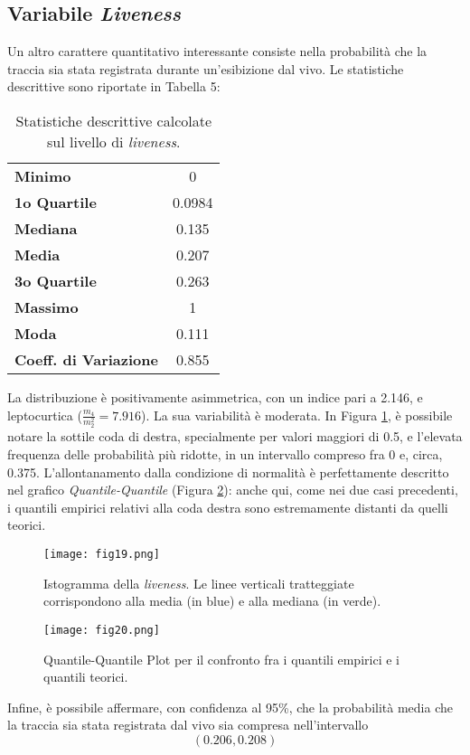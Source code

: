 \documentclass[fleqn,10pt]{SelfArx} %
\begin{document}
\subsection*{Variabile \textit{Liveness}}
Un altro carattere quantitativo interessante consiste nella probabilità che la traccia sia stata registrata durante un'esibizione dal vivo. Le statistiche descrittive sono riportate in Tabella 5:
{\begin{table}[H]
\centering

\begin{tabular}[t]{lc}
\toprule
\midrule
\textbf{Minimo}&0\\
\textbf{1o Quartile}&0.0984\\
\textbf{Mediana}&0.135\\
\textbf{Media}&0.207\\
\textbf{3o Quartile}&0.263\\
\textbf{Massimo}&1\\
\textbf{Moda}&0.111\\
\textbf{Coeff. di Variazione}&0.855\\
\bottomrule
\end{tabular}
\caption{Statistiche descrittive calcolate sul livello di \textit{liveness}.}
\end{table}}
La distribuzione è positivamente asimmetrica, con un indice pari a 2.146, e leptocurtica ($\frac{m_4}{m_2^{2}}=7.916$). La sua variabilità è moderata. In Figura \ref{fig:fig19}, è possibile notare la sottile coda di destra, specialmente per valori maggiori di 0.5, e l'elevata frequenza delle probabilità più ridotte, in un intervallo compreso fra 0 e, circa, 0.375. L'allontanamento dalla condizione di normalità è perfettamente descritto nel grafico \textit{Quantile-Quantile} (Figura \ref{fig:fig20}): anche qui, come nei due casi precedenti, i quantili empirici relativi alla coda destra sono estremamente distanti da quelli teorici.
\begin{figure}[H]
    \centering
    \texttt{[image: fig19.png]}
    \label{fig:fig19}
    \caption{Istogramma della \textit{liveness}. Le linee verticali tratteggiate corrispondono alla media (in blue) e alla mediana (in verde).}
\end{figure}
\begin{figure}[H]
    \centering
    \texttt{[image: fig20.png]}
    \label{fig:fig20}
    \caption{Quantile-Quantile Plot per il confronto fra i quantili empirici e i quantili teorici.}
\end{figure}
Infine, è possibile affermare, con confidenza al 95\%, che la probabilità media che la traccia sia stata registrata dal vivo sia compresa nell'intervallo
\begin{equation}
    (0.206, 0.208)
\end{equation}
\end{document}
